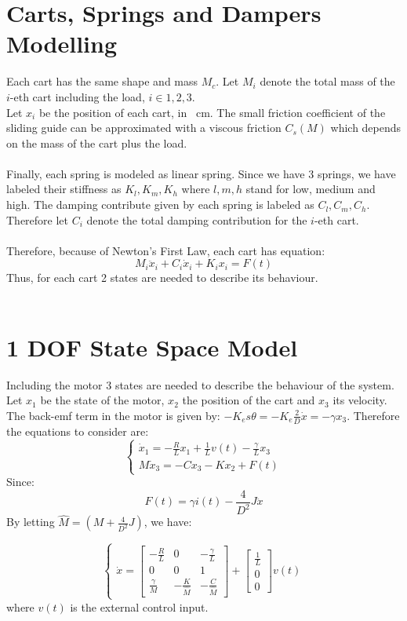 \section{Carts, Springs and Dampers Modelling}
Each cart has the same shape and mass $M_{c}$. Let $M_{i}$ denote the total mass of the $i$-eth cart including the load, $i \in {1,2,3}$. \\
Let $x_{i}$ be the position of each cart, in \SI{}{\cm}. The small friction coefficient of the sliding guide can be approximated with a viscous friction $C_{s}(M)$ which depends on the mass of the cart plus the load. \\ \\
Finally, each spring is modeled as linear spring. Since we have 3 springs, we have labeled their stiffness as $K_l, K_m, K_h$ where $l,m,h$ stand for low, medium and high. The damping contribute given by each spring is labeled as $C_l, C_m, C_h$. Therefore let $C_{i}$ denote the total damping contribution for the $i$-eth cart.\\ \\
Therefore, because of Newton's First Law, each cart has equation:
$$M_i \ddot{x}_i + C_{i} \dot{x}_i + K_{i}x_{i}=F(t)$$
Thus, for each cart 2 states are needed to describe its behaviour.\\ \\
\section{1 DOF State Space Model}
Including the motor 3 states are needed to describe the behaviour of the system. Let $x_{1}$ be the state of the motor, $x_{2}$ the position of the cart and $x_{3}$ its velocity. The back-emf term in the motor is given by: $-K_e s \theta = -K_e \frac{2}{D}\dot{x} = -\gamma x_3$. Therefore the equations to consider are:
\begin{equation}
\begin{cases}
\dot{x}_1 = -\frac{R}{L}x_{1}+\frac{1}{L} v(t)-\frac{\gamma}{L}x_3  \\
M\dot{x}_3 = -Cx_3 -K x_2 + F(t)
\end{cases}
\end{equation}
Since:
$$F(t)=\gamma i(t) - \frac{4}{D^2}J \ddot{x}$$
By letting $\hat{M} = (M+\frac{4}{D^2}J)$, we have:

\begin{equation}
\begin{cases}
\dot{x}=\begin{bmatrix}
-\frac{R}{L} &0 & -\frac{\gamma}{L} \\
0 & 0 & 1 \\ 
 \frac{\gamma}{M} & -\frac{K}{\hat{M}} & -\frac{C}{\hat{M}}
\end{bmatrix}
+
\begin{bmatrix}\frac{1}{L} \\ 0 \\ 0\end{bmatrix} v(t)
\end{cases}
\end{equation}
where $v(t)$ is the external control input.

